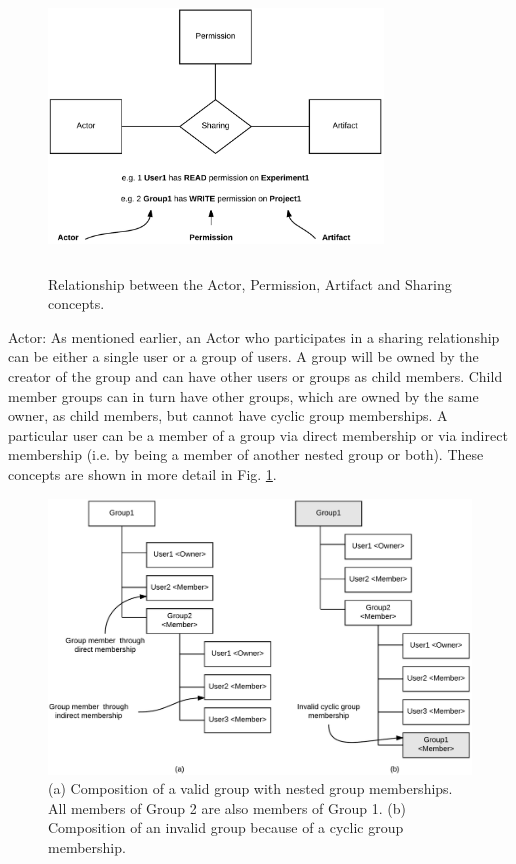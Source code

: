 \documentclass[sigconf]{acmart}
\begin{document}
\begin{figure}\label{image:permission-model}
\includegraphics[height=3in, width=3.5in]{figures/sharing-concepts.pdf}
\caption{Relationship between the Actor, Permission, Artifact and Sharing concepts.}
\end{figure}

Actor: As mentioned earlier, an Actor who participates in a sharing relationship can be either a single user or a group of users. A group will be owned by the creator of the group and can have other users or groups as child members. Child member groups can in turn have other groups, which are owned by the same owner, as child members, but cannot have cyclic group memberships. A particular user can be a member of a group via direct membership or via indirect membership (i.e. by being a member of another nested group or both). These concepts are shown in more detail in Fig. \ref{image:permission-model}.

\begin{figure}
\includegraphics[width=\columnwidth]{figures/group-composition.pdf}
\caption{(a) Composition of a valid group with nested group memberships. All members of Group 2 are also members of Group 1. (b) Composition of an invalid group because of a cyclic group membership.}
\end{figure}
\end{document}
